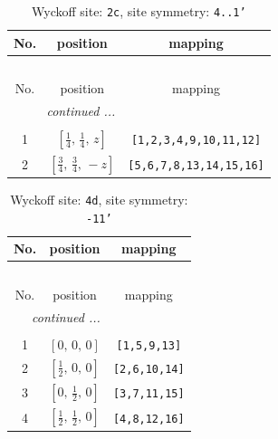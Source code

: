 \documentclass[fleqn,8pt]{jsarticle}
\begin{document}
\renewcommand{\arraystretch}{1.2}
\begin{longtable}{ccc}
\caption{Wyckoff site: {\tt 2c}, site symmetry: {\tt 4..1'}}
 \\
 \hline \hline
No. & position & mapping \\ \hline \endfirsthead

\multicolumn{2}{l}{\tablename\ \thetable{}} \\
 \hline \hline
No. & position & mapping \\ \hline \endhead

 \hline \hline
\multicolumn{2}{r}{\footnotesize\it continued ...} \\ \endfoot

 \hline \hline
\multicolumn{2}{r}{} \\ \endlastfoot

1 & $\left[ \frac{1}{4},\, \frac{1}{4},\, z \right]$ & {\tt [1,2,3,4,9,10,11,12]} \\ \hline
2 & $\left[ \frac{3}{4},\, \frac{3}{4},\, - z \right]$ & {\tt [5,6,7,8,13,14,15,16]} \\
\end{longtable}
\renewcommand{\arraystretch}{1.2}
\begin{longtable}{ccc}
\caption{Wyckoff site: {\tt 4d}, site symmetry: {\tt -11'}}
 \\
 \hline \hline
No. & position & mapping \\ \hline \endfirsthead

\multicolumn{2}{l}{\tablename\ \thetable{}} \\
 \hline \hline
No. & position & mapping \\ \hline \endhead

 \hline \hline
\multicolumn{2}{r}{\footnotesize\it continued ...} \\ \endfoot

 \hline \hline
\multicolumn{2}{r}{} \\ \endlastfoot

1 & $\left[ 0,\, 0,\, 0 \right]$ & {\tt [1,5,9,13]} \\ \hline
2 & $\left[ \frac{1}{2},\, 0,\, 0 \right]$ & {\tt [2,6,10,14]} \\ \hline
3 & $\left[ 0,\, \frac{1}{2},\, 0 \right]$ & {\tt [3,7,11,15]} \\ \hline
4 & $\left[ \frac{1}{2},\, \frac{1}{2},\, 0 \right]$ & {\tt [4,8,12,16]} \\
\end{longtable}
\renewcommand{\arraystretch}{1.2}
\end{document}
